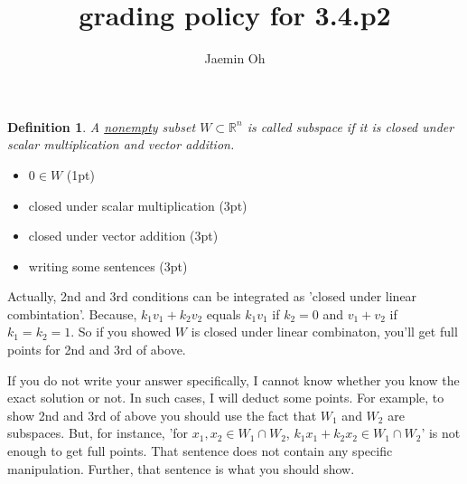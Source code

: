 \documentclass{oblivoir}
\author{Jaemin Oh}
\title{grading policy for 3.4.p2}
\newtheorem*{definition}{Definition}
\begin{document}
\maketitle

\begin{definition}
	A \underline{nonempty} subset $W \subset \mathbb{R}^n$ is called subspace if it is closed under scalar multiplication and vector addition.
	\label{<+label+>}
\end{definition}

\begin{itemize}
\item $0 \in W$ (1pt)
\item closed under scalar multiplication (3pt)
\item closed under vector addition (3pt)
\item writing some sentences (3pt)
\end{itemize}

Actually, 2nd and 3rd conditions can be integrated as 'closed under linear combintation'. Because, $k_1 v_1 + k_2 v_2$ equals $k_1 v_1$ if $k_2 = 0$ and $v_1 + v_2$ if $k_1 = k_2 = 1$. So if you showed $W$ is closed under linear combinaton, you'll get full points for 2nd and 3rd of above.

If you do not write your answer specifically, I cannot know whether you know the exact solution or not. In such cases, I will deduct some points. For example, to show 2nd and 3rd of above you should use the fact that $W_1$ and $W_2$ are subspaces. But, for instance, 'for $x_1, x_2 \in W_1\cap W_2$, $k_1 x_1 + k_2 x_2 \in W_1 \cap W_2$' is not enough to get full points. That sentence does not contain any specific manipulation. Further, that sentence is what you should show.
\end{document}
